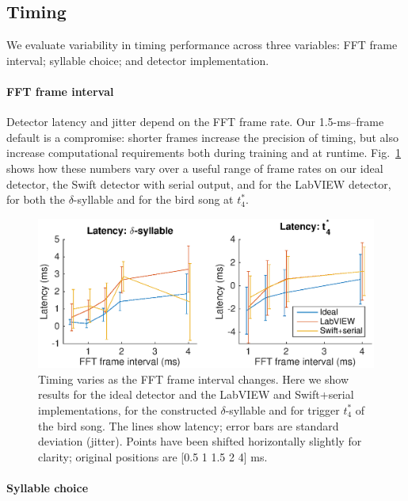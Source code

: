 \documentclass[10pt,letterpaper]{article}
\newcommand\fig[1]{Fig.~\ref{#1}}
\renewcommand{\subsubsection}[1]{\paragraph{#1}}
\begin{document}
\subsection{Timing}

We evaluate variability in timing performance across three variables:
FFT frame interval; syllable choice; and detector implementation.

\subsubsection{FFT frame interval}

Detector latency and jitter depend on the FFT frame rate.  Our
1.5-ms--frame default is a compromise: shorter frames increase the
precision of timing, but also increase computational requirements both
during training and at runtime.  \fig{fig:TimingVsFrame} shows how
these numbers vary over a useful range of frame rates on our ideal
detector, the Swift detector with serial output, and for the LabVIEW
detector, for both the $\delta$-syllable and for the bird song at
$t^*_4$.

\begin{figure}
  \includegraphics[width=\textwidth]{Fig4}
  \caption{Timing varies as the FFT frame interval changes.  Here we
    show results for the ideal detector and the LabVIEW and
    Swift+serial implementations, for the constructed
    $\delta$-syllable and for trigger $t^*_4$ of the bird song.  The
    lines show latency; error bars are standard deviation (jitter).  Points have
    been shifted horizontally slightly for clarity; original positions are [0.5 1
      1.5 2 4] ms.}
  \label{fig:TimingVsFrame}
\end{figure}

\subsubsection{Syllable choice}
\end{document}
